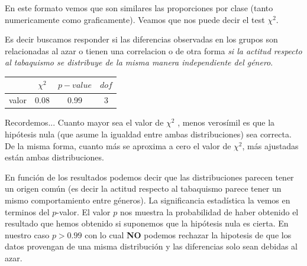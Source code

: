 \documentclass[8pt]{beamer}
\begin{document}
\begin{frame}
\begin{multicols}{2}
\begin{figure}
 \end{figure}
 \columnbreak
\small{En este formato vemos que son similares las proporciones por clase (tanto numericamente como graficamente). Veamos que nos puede decir el test $\chi^2$.} 
\end{multicols}
\end{frame}


\begin{frame}
Es decir buscamos responder si las diferencias observadas en los grupos son relacionadas al azar o tienen una correlacion o de otra forma \textit{si la actitud respecto al tabaquismo se distribuye de la misma manera independiente del género}. 

\begin{table}
\begin{tabular}{lccc}
\toprule
{} &  $\chi^2$ &  $p-value$ &  $dof$  \\
\midrule
valor &        0.08 &       0.99 &      3  \\
\bottomrule
\end{tabular}
\end{table} 
\pause
\begin{exampleblock}{Recordemos...}
Cuanto mayor sea el valor de $\chi^2$ , menos verosímil es que la hipótesis nula (que asume la igualdad entre ambas distribuciones) sea correcta. De la misma forma, cuanto más se aproxima a cero el valor de $\chi^2$, más ajustadas están ambas distribuciones. 
\end{exampleblock}
\pause
\begin{block}{}
En función de los resultados podemos decir que las distribuciones parecen tener un origen común (es decir la actitud respecto al tabaquismo parece tener un mismo comportamiento entre géneros). La significancia estadística la vemos en terminos del $p$-valor. El valor $p$ nos muestra la probabilidad de haber obtenido el resultado que hemos obtenido si suponemos que la hipótesis nula es cierta. En nuestro caso $p>0.99$ con lo cual \textbf{NO} podemos rechazar la hipotesis de que los datos provengan de una misma distribución y las diferencias solo sean debidas al azar.
\end{block}
\end{frame}
\end{document}
